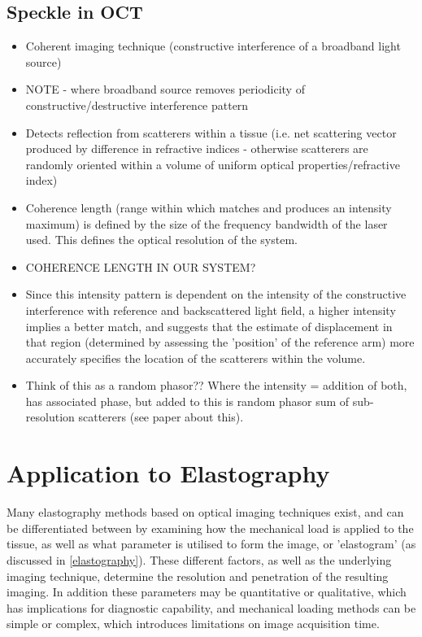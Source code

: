 \subsection{Speckle in OCT}
\begin{itemize}
	\item Coherent imaging technique (constructive interference of a broadband light source)
	\item NOTE - where broadband source removes periodicity of constructive/destructive interference pattern
	\item Detects reflection from scatterers within a tissue (i.e. net scattering vector produced by difference in refractive indices - otherwise scatterers are randomly oriented within a volume of uniform optical properties/refractive index)
	\item Coherence length (range within which matches and produces an intensity maximum) is defined by the size of the frequency bandwidth of the laser used. This defines the optical resolution of the system.
	\item COHERENCE LENGTH IN OUR SYSTEM?
	\item Since this intensity pattern is dependent on the intensity of the constructive interference with reference and backscattered light field, a higher intensity implies a better match, and suggests that the estimate of displacement in that region (determined by assessing the 'position' of the reference arm) more accurately specifies the location of the scatterers within the volume.
	\item Think of this as a random phasor?? Where the intensity = addition of both, has associated phase, but added to this is random phasor sum of sub-resolution scatterers (see paper about this).
\end{itemize}

\section{Application to Elastography}\label{application_elastography}

Many elastography methods based on optical imaging techniques exist, and can be differentiated between by examining how the mechanical load is applied to the tissue, as well as what parameter is utilised to form the image, or 'elastogram' (as discussed in \autoref{elastography}). These different factors, as well as the underlying imaging technique, determine the resolution and penetration of the resulting imaging. In addition these parameters may be quantitative or qualitative, which has implications for diagnostic capability, and mechanical loading methods can be simple or complex, which introduces limitations on image acquisition time.

